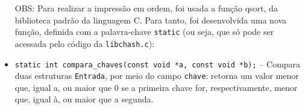 \documentclass[a4paper, 11pt]{article}
\begin{document}
\begin{itemize}
        OBS: Para realizar a impressão em ordem, foi usada a função qsort, da biblioteca
        padrão da linguagem C. Para tanto, foi desenvolvida uma nova função, definida
        com a palavra-chave \texttt{static} (ou seja, que só pode ser acessada pelo
        código da \texttt{libchash.c}):
    \item \texttt{static int compara\_chaves(const void *a, const void *b);} -- Compara
        duas estruturas \texttt{Entrada}, por meio do campo \texttt{chave}: retorna um
        valor menor que, igual a, ou maior que 0 se a primeira chave for, respectivamente,
        menor que, igual à, ou maior que a segunda.
\end{itemize}
\end{document}
